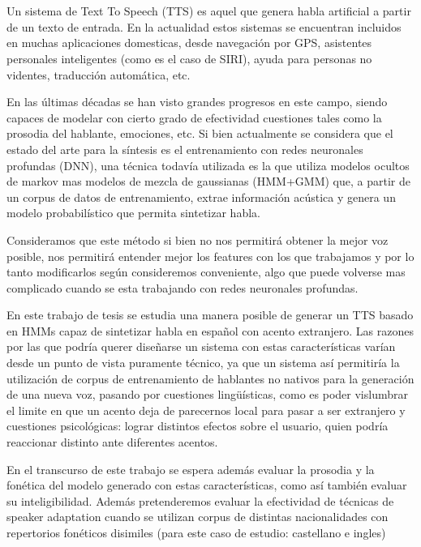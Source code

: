 \chapter*{\runtitle}

\noindent Un sistema de Text To Speech (TTS) es aquel que genera habla artificial a partir de un texto de entrada. En la actualidad estos sistemas se encuentran incluidos en muchas aplicaciones domesticas, desde navegación por GPS, asistentes personales inteligentes (como es el caso de SIRI), ayuda para personas no videntes, traducción automática, etc.

\noindent En las últimas décadas se han visto grandes progresos en este campo, siendo capaces de modelar con cierto grado de efectividad cuestiones tales como la prosodia del hablante, emociones, etc. Si bien actualmente se considera que el estado del arte para la síntesis es el entrenamiento con redes neuronales profundas (DNN), una técnica todavía utilizada es la que utiliza modelos ocultos de markov mas modelos de mezcla de gaussianas (HMM+GMM) que, a partir de un corpus de datos de entrenamiento, extrae información acústica y genera un modelo probabilístico que permita sintetizar habla. 

Consideramos que este método si bien no nos permitirá obtener la mejor voz posible, nos permitirá entender mejor los features con los que trabajamos y por lo tanto modificarlos según consideremos conveniente, algo que puede volverse mas complicado cuando se esta trabajando con redes neuronales profundas.

\noindent En este trabajo de tesis se estudia una manera posible de generar un TTS basado en HMMs capaz de sintetizar habla en español con acento extranjero. Las razones por las que podría querer diseñarse un sistema con estas características varían desde un punto de vista puramente técnico, ya que un sistema así permitiría la utilización de corpus de entrenamiento de hablantes no nativos para la generación de una nueva voz, pasando por cuestiones lingüísticas, como es poder vislumbrar el limite en que un acento deja de parecernos local para pasar a ser extranjero y cuestiones psicológicas: lograr distintos efectos sobre el usuario, quien podría reaccionar distinto ante diferentes acentos.

\noindent En el transcurso de este trabajo se espera además evaluar la prosodia y la fonética del modelo generado con estas características, como así también evaluar su inteligibilidad. Además pretenderemos evaluar la efectividad de técnicas de speaker adaptation cuando se utilizan corpus de distintas nacionalidades con repertorios fonéticos disimiles (para este caso de estudio: castellano e ingles)

